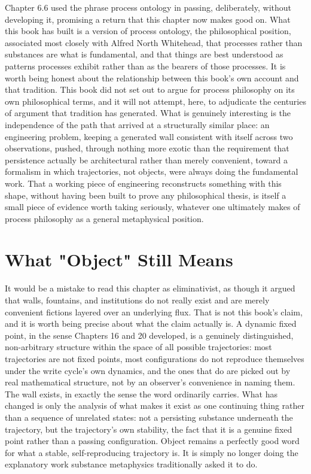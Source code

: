 Chapter 6.6 used the phrase process ontology in passing, deliberately, without developing it, promising a return that this chapter now makes good on. What this book has built is a version of process ontology, the philosophical position, associated most closely with Alfred North Whitehead, that processes rather than substances are what is fundamental, and that things are best understood as patterns processes exhibit rather than as the bearers of those processes. It is worth being honest about the relationship between this book's own account and that tradition. This book did not set out to argue for process philosophy on its own philosophical terms, and it will not attempt, here, to adjudicate the centuries of argument that tradition has generated. What is genuinely interesting is the independence of the path that arrived at a structurally similar place: an engineering problem, keeping a generated wall consistent with itself across two observations, pushed, through nothing more exotic than the requirement that persistence actually be architectural rather than merely convenient, toward a formalism in which trajectories, not objects, were always doing the fundamental work. That a working piece of engineering reconstructs something with this shape, without having been built to prove any philosophical thesis, is itself a small piece of evidence worth taking seriously, whatever one ultimately makes of process philosophy as a general metaphysical position.

\section{What "Object" Still Means}

It would be a mistake to read this chapter as eliminativist, as though it argued that walls, fountains, and institutions do not really exist and are merely convenient fictions layered over an underlying flux. That is not this book's claim, and it is worth being precise about what the claim actually is. A dynamic fixed point, in the sense Chapters 16 and 20 developed, is a genuinely distinguished, non-arbitrary structure within the space of all possible trajectories: most trajectories are not fixed points, most configurations do not reproduce themselves under the write cycle's own dynamics, and the ones that do are picked out by real mathematical structure, not by an observer's convenience in naming them. The wall exists, in exactly the sense the word ordinarily carries. What has changed is only the analysis of what makes it exist as one continuing thing rather than a sequence of unrelated states: not a persisting substance underneath the trajectory, but the trajectory's own stability, the fact that it is a genuine fixed point rather than a passing configuration. Object remains a perfectly good word for what a stable, self-reproducing trajectory is. It is simply no longer doing the explanatory work substance metaphysics traditionally asked it to do.

